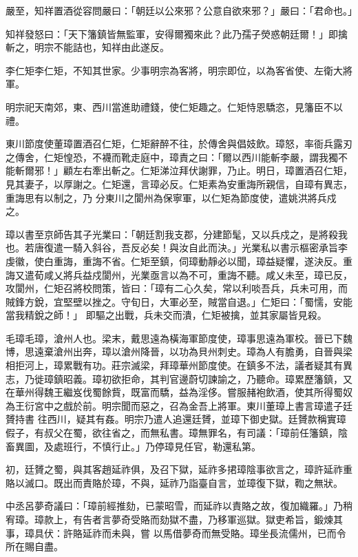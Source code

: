 \begin{pinyinscope}
 嚴至，知祥置酒從容問嚴曰：「朝廷以公來邪？公意自欲來邪？」嚴曰：「君命也。」



 知祥發怒曰：「天下籓鎮皆無監軍，安得爾獨來此？此乃孺子熒惑朝廷爾！」即擒
 斬之，明宗不能詰也，知祥由此遂反。



 李仁矩李仁矩，不知其世家。少事明宗為客將，明宗即位，以為客省使、左衛大將軍。



 明宗祀天南郊，東、西川當進助禮錢，使仁矩趣之。仁矩恃恩驕恣，見籓臣不以禮。



 東川節度使董璋置酒召仁矩，仁矩辭醉不往，於傳舍與倡妓飲。璋怒，率衙兵露刃之傳舍，仁矩惶恐，不襪而靴走庭中，璋責之曰：「爾以西川能斬李嚴，謂我獨不能斬爾邪！」顧左右牽出斬之。仁矩涕泣拜伏謝罪，乃止。明日，璋置酒召仁矩，見其妻子，以厚謝之。仁矩還，言璋必反。仁矩素為安重誨所親信，自璋有異志，重誨思有以制之，乃
 分東川之閬州為保寧軍，以仁矩為節度使，遣姚洪將兵戍之。



 璋以書至京師告其子光業曰：「朝廷割我支郡，分建節髦，又以兵戍之，是將殺我也。若唐復遣一騎入斜谷，吾反必矣！與汝自此而決。」光業私以書示樞密承旨李虔徽，使白重誨，重誨不省。仁矩至鎮，伺璋動靜必以聞，璋益疑懼，遂決反。重誨又遣荀咸乂將兵益戍閬州，光業亟言以為不可，重誨不聽。咸乂未至，璋已反，攻閬州，仁矩召將校問策，皆曰：「璋有二心久矣，常以利啖吾兵，兵未可用，而賊鋒方銳，宜堅壁以挫之。守旬日，大軍必至，賊當自退。」仁矩曰：「蜀懦，安能當我精銳之師！」
 即驅之出戰，兵未交而潰，仁矩被擒，並其家屬皆見殺。



 毛璋毛璋，滄州人也。梁末，戴思遠為橫海軍節度使，璋事思遠為軍校。晉已下魏博，思遠棄滄州出奔，璋以滄州降晉，以功為貝州刺史。璋為人有膽勇，自晉與梁相拒河上，璋累戰有功。莊宗滅梁，拜璋華州節度使。在鎮多不法，議者疑其有異志，乃徙璋鎮昭義。璋初欲拒命，其判官邊蔚切諫諭之，乃聽命。璋累歷籓鎮，又在華州得魏王繼岌伐蜀餘貲，既富而驕，益為淫侈。嘗服赭袍飲酒，使其所得蜀奴為王衍宮中之戲於前。明宗聞而惡之，召為金吾上將軍。東川董璋上書言璋遣子廷贇持書
 往西川，疑其有姦。明宗乃遣人追還廷贇，並璋下御史獄。廷贇款稱實璋假子，有叔父在蜀，欲往省之，而無私書。璋無罪名，有司議：「璋前任籓鎮，陰畜異圖，及處班行，不慎行止。」乃停璋見任官，勒還私第。



 初，廷贇之蜀，與其客趙延祚俱，及召下獄，延祚多捃璋陰事欲言之，璋許延祚重賂以滅口。既出而責賂於璋，不與，延祚乃詣臺自言，並璋復下獄，鞫之無狀。



 中丞呂夢奇議曰：「璋前經推劾，已蒙昭雪，而延祚以責賂之故，復加織羅。」乃稍宥璋。璋款上，有告者言夢奇受賂而劾獄不盡，乃移軍巡獄。獄吏希旨，鍛煉其事，璋具伏：許賂延祚而未與，嘗
 以馬借夢奇而無受賂。璋坐長流儒州，已而令所在賜自盡。



\end{pinyinscope}